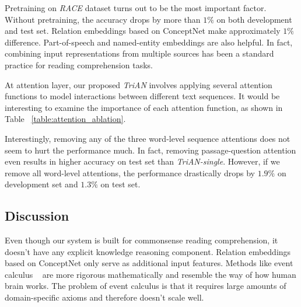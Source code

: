 \documentclass[11pt,a4paper]{article}
\begin{document}
Pretraining on \emph{RACE} dataset turns out to be the most important factor.
Without pretraining,
the accuracy drops by more than $1\%$ on both development and test set.
Relation embeddings based on ConceptNet make approximately $1\%$ difference.
Part-of-speech and named-entity embeddings are also helpful.
In fact,
combining input representations from multiple sources
has been a standard practice for reading comprehension tasks.

At attention layer,
our proposed \emph{TriAN} involves applying several attention functions
to model interactions between different text sequences.
It would be interesting to examine the importance of each attention function,
as shown in Table ~\ref{table:attention_ablation}.

\begin{table}[ht]
\hskip-0.3cm
\centering
{}
\caption{Ablation study for attention.
The last one ``\emph{w/o attention}'' removes all word-level attentions.}
\label{table:attention_ablation}
\end{table}

Interestingly,
removing any of the three word-level sequence attentions does not seem to hurt the performance much.
In fact,
removing passage-question attention even results in higher accuracy on test set than \emph{TriAN-single}.
However,
if we remove all word-level attentions,
the performance drastically drops by $1.9\%$ on development set and $1.3\%$ on test set.

\subsection{Discussion}

Even though our system is built for commonsense reading comprehension,
it doesn't have any explicit knowledge reasoning component.
Relation embeddings based on ConceptNet only serve as additional input features.
Methods like event calculus ~\cite{mueller2014commonsense} are more rigorous mathematically
and resemble the way of how human brain works.
The problem of event calculus is that
it requires large amounts of domain-specific axioms
and therefore doesn't scale well.
\end{document}
